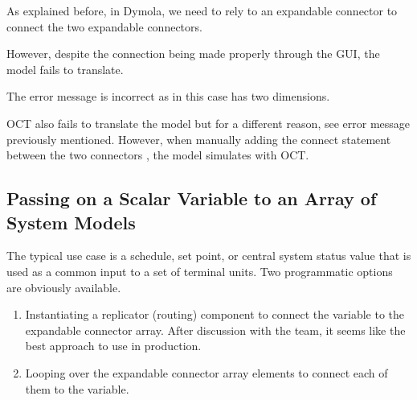 \documentclass[letterpaper,10pt, openany,english]{sphinxmanual}
\begin{document}

As explained before, in Dymola, we need to rely to an  expandable connector to connect the two  expandable connectors.

\begin{figure}[htbp]
\centering

\noindent{}
\end{figure}

However, despite the connection being made properly through the GUI, the model fails to translate.

\begin{sphinxVerbatim}[commandchars=\\\{\}]
    

         
         
\end{sphinxVerbatim}

The error message is incorrect as in this case  has two dimensions.

OCT also fails to translate the model but for a different reason, see error message previously mentioned.
However, when manually adding the connect statement between the two  connectors , the model simulates with OCT.


\subsection{Passing on a Scalar Variable to an Array of System Models}
\label{\detokenize{annex:passing-on-a-scalar-variable-to-an-array-of-system-models}}
The typical use case is a schedule, set point, or central system status value that is used as a common input to a set of terminal units.
Two programmatic options are obviously available.
\begin{enumerate}
%
\item {} 
Instantiating a replicator (routing) component to connect the variable to the expandable connector array. After discussion with the team, it seems like the best approach to use in production.

\item {} 
Looping over the expandable connector array elements to connect each of them to the variable.

\end{enumerate}
\end{document}
